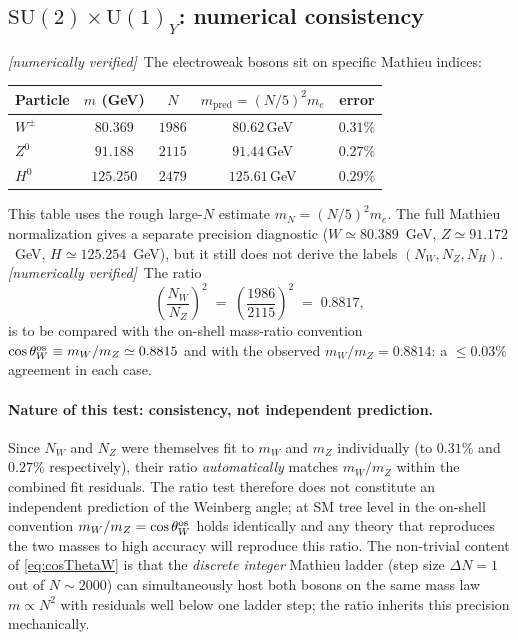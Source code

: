 \documentclass[11pt]{article}
\newcommand{\numerical}{\textit{[numerically verified]}}
\begin{document}
\subsection{$\mathrm{SU}(2)\times\mathrm{U}(1)_Y$: numerical
consistency}
\label{sec:phaseA_ew}

\numerical\ The electroweak bosons sit on specific Mathieu
indices:
\begin{center}
\begin{tabular}{lcccc}
\toprule
Particle & $m$ (GeV) & $N$ & $m_{\text{pred}}=(N/5)^2 m_e$ &
  error \\
\midrule
$W^\pm$ & $80.369$ & $1986$ & $80.62$\,GeV & $0.31\%$ \\
$Z^0$  & $91.188$ & $2115$ & $91.44$\,GeV & $0.27\%$ \\
$H^0$  & $125.250$& $2479$ & $125.61$\,GeV& $0.29\%$ \\
\bottomrule
\end{tabular}
\end{center}
\noindent
This table uses the rough large-$N$ estimate
$m_N=(N/5)^2m_e$.  The full Mathieu normalization gives a
separate precision diagnostic
($W\simeq80.389$~GeV, $Z\simeq91.172$~GeV,
$H\simeq125.254$~GeV), but it still does not derive the
labels $(N_W,N_Z,N_H)$.
\numerical\ The ratio
\begin{equation}
  \label{eq:cosThetaW}
  \left(\frac{N_W}{N_Z}\right)^{\!2}
  \;=\;\left(\frac{1986}{2115}\right)^{\!2}
  \;=\;0.8817,
\end{equation}
is to be compared with the on-shell mass-ratio convention
$\cos\theta_W^{\rm os}\equiv m_W/m_Z\simeq0.8815$
\cite{PDG2024} and with the observed
$m_W/m_Z=0.8814$: a $\leq 0.03\%$ agreement in each case.

\paragraph{Nature of this test: consistency, not independent
prediction.}
Since $N_W$ and $N_Z$ were themselves fit to $m_W$ and $m_Z$
individually (to $0.31\%$ and $0.27\%$ respectively), their
ratio \emph{automatically} matches $m_W/m_Z$ within the
combined fit residuals. The ratio test therefore does not
constitute an independent prediction of the Weinberg angle; at SM
tree level in the on-shell convention
$m_W/m_Z=\cos\theta_W^{\rm os}$ holds identically and any
theory that reproduces the two masses to high accuracy will
reproduce this ratio. The non-trivial content of
\eqref{eq:cosThetaW} is that the \emph{discrete integer}
Mathieu ladder (step size $\Delta N=1$ out of $N\sim 2000$)
can simultaneously host both bosons on the same mass law
$m\propto N^2$ with residuals well below one ladder step; the
ratio inherits this precision mechanically.
\end{document}
